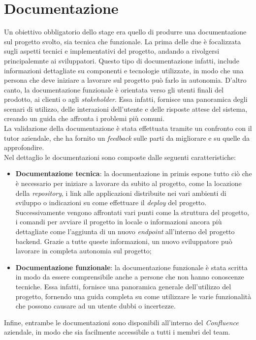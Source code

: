 \section{Documentazione}
Un obiettivo obbligatorio dello stage era quello di produrre una documentazione sul progetto svolto, sia tecnica che funzionale.
La prima delle due è focalizzata sugli aspetti tecnici e implementativi del progetto, andando a rivolgersi principalemnte ai sviluppatori.
Questo tipo di documentazione infatti, include informazioni dettagliate su componenti e tecnologie utilizzate, in modo che una persona che deve iniziare a lavorare sul progetto
può farlo in autonomia.
D'altro canto, la documentazione funzionale è orientata verso gli utenti finali del prodotto, ai clienti o agli \textit{stakeholder}.
Essa infatti, fornisce una panoramica degli scenari di utilizzo, delle interazioni dell'utente e delle risposte attese del sistema, creando un guida che affronta i problemi più comuni.\\
La validazione della documentazione è stata effettuata tramite un confronto con il tutor aziendale, che ha fornito un \textit{feedback} sulle parti da migliorare e su quelle da approfondire.\\
Nel dettaglio le documentazioni sono composte dalle seguenti caratteristiche:
\begin{itemize}
  \item \textbf{Documentazione tecnica}: la documentazione in primis espone tutto ciò che è necessario per iniziare a lavorare da subito al progetto, come la locazione della \textit{repository}, i link 
  alle applicazioni distribuite nei vari ambienti di sviluppo o indicazioni su come effettuare il \textit{deploy} del progetto.\\
  Successivamente vengono affrontati vari punti come la struttura del progetto, i comandi per avviare il progetto in locale o informazioni ancora più dettagliate come l'aggiunta di un nuovo \textit{endpoint} all'interno del progetto backend.
  Grazie a tutte queste informazioni, un nuovo sviluppatore può lavorare in completa autonomia sul progetto;
  \item \textbf{Documentazione funzionale}: la documentazione funzionale è stata scritta in modo da essere comprensibile anche a persone che non hanno conoscenze tecniche.
  Essa infatti, fornisce una panoramica generale dell'utilizzo del progetto, fornendo una guida completa su come utilizzare le varie funzionalità che possono
  causare ad un utente dubbi o incertezze.
\end{itemize}
Infine, entrambe le documentazioni sono disponibili all'interno del \textit{Confluence} aziendale, in modo che sia facilmente accessibile a tutti i membri del team.

